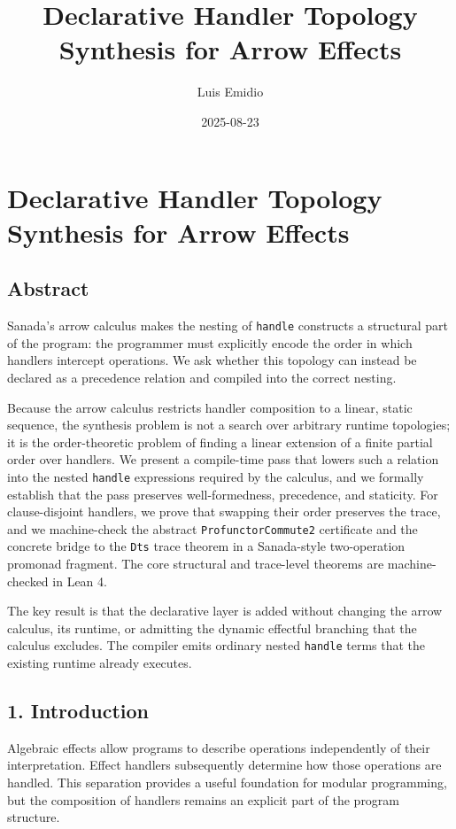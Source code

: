 \documentclass[
  11pt,
]{article}
\title{Declarative Handler Topology Synthesis for Arrow Effects}
\author{Luis Emidio}
\date{2025-08-23}
\begin{document}
\maketitle

\section{Declarative Handler Topology Synthesis for Arrow
Effects}\label{declarative-handler-topology-synthesis-for-arrow-effects}

\subsection{Abstract}\label{abstract}

Sanada's arrow calculus makes the nesting of \texttt{handle} constructs
a structural part of the program: the programmer must explicitly encode
the order in which handlers intercept operations. We ask whether this
topology can instead be declared as a precedence relation and compiled
into the correct nesting.

Because the arrow calculus restricts handler composition to a linear,
static sequence, the synthesis problem is not a search over arbitrary
runtime topologies; it is the order-theoretic problem of finding a
linear extension of a finite partial order over handlers. We present a
compile-time pass that lowers such a relation into the nested
\texttt{handle} expressions required by the calculus, and we formally
establish that the pass preserves well-formedness, precedence, and
staticity. For clause-disjoint handlers, we prove that swapping their
order preserves the trace, and we machine-check the abstract
\texttt{ProfunctorCommute2} certificate and the concrete bridge to the
\texttt{Dts} trace theorem in a Sanada-style two-operation promonad
fragment. The core structural and trace-level theorems are
machine-checked in Lean 4.

The key result is that the declarative layer is added without changing
the arrow calculus, its runtime, or admitting the dynamic effectful
branching that the calculus excludes. The compiler emits ordinary nested
\texttt{handle} terms that the existing runtime already executes.

\subsection{1. Introduction}\label{introduction}

Algebraic effects allow programs to describe operations independently of
their interpretation. Effect handlers subsequently determine how those
operations are handled. This separation provides a useful foundation for
modular programming, but the composition of handlers remains an explicit
part of the program structure.
\end{document}
